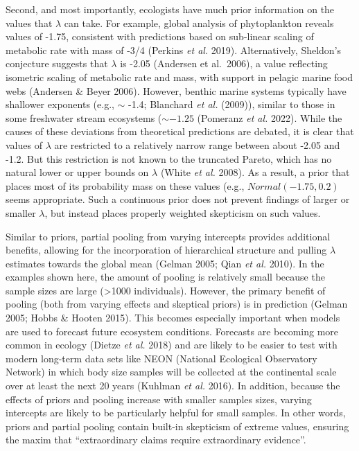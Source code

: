 \documentclass[
  12pt,
]{article}
\begin{document}
Second, and most importantly, ecologists have much prior information on
the values that \(\lambda\) can take. For example, global analysis of
phytoplankton reveals values of -1.75, consistent with predictions based
on sub-linear scaling of metabolic rate with mass of -3/4 (Perkins
\emph{et al.} 2019). Alternatively, Sheldon's conjecture suggests that
\(\lambda\) is -2.05 (Andersen et al.~2006), a value reflecting
isometric scaling of metabolic rate and mass, with support in pelagic
marine food webs (Andersen \& Beyer 2006). However, benthic marine
systems typically have shallower exponents (e.g., \(\sim\) -1.4;
Blanchard \emph{et al.} (2009)), similar to those in some freshwater
stream ecosystems (\(\sim -1.25\) (Pomeranz \emph{et al.} 2022). While
the causes of these deviations from theoretical predictions are debated,
it is clear that values of \(\lambda\) are restricted to a relatively
narrow range between about -2.05 and -1.2. But this restriction is not
known to the truncated Pareto, which has no natural lower or upper
bounds on \(\lambda\) (White \emph{et al.} 2008). As a result, a prior
that places most of its probability mass on these values (e.g.,
\(Normal(-1.75, 0.2)\) seems appropriate. Such a continuous prior does
not prevent findings of larger or smaller \(\lambda\), but instead
places properly weighted skepticism on such values.

Similar to priors, partial pooling from varying intercepts provides
additional benefits, allowing for the incorporation of hierarchical
structure and pulling \(\lambda\) estimates towards the global mean
(Gelman 2005; Qian \emph{et al.} 2010). In the examples shown here, the
amount of pooling is relatively small because the sample sizes are large
(\textgreater1000 individuals). However, the primary benefit of pooling
(both from varying effects and skeptical priors) is in prediction
(Gelman 2005; Hobbs \& Hooten 2015). This becomes especially important
when models are used to forecast future ecosystem conditions. Forecasts
are becoming more common in ecology (Dietze \emph{et al.} 2018) and are
likely to be easier to test with modern long-term data sets like NEON
(National Ecological Observatory Network) in which body size samples
will be collected at the continental scale over at least the next 20
years (Kuhlman \emph{et al.} 2016). In addition, because the effects of
priors and pooling increase with smaller samples sizes, varying
intercepts are likely to be particularly helpful for small samples. In
other words, priors and partial pooling contain built-in skepticism of
extreme values, ensuring the maxim that ``extraordinary claims require
extraordinary evidence''.
\end{document}
